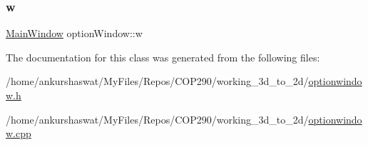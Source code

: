 \subsubsection{\texorpdfstring{w}{w}}
{\footnotesize\ttfamily \hyperlink{classMainWindow}{Main\+Window} option\+Window\+::w}



The documentation for this class was generated from the following files\+:\begin{DoxyCompactItemize}
\item 
/home/ankurshaswat/\+My\+Files/\+Repos/\+C\+O\+P290/working\+\_\+3d\+\_\+to\+\_\+2d/\hyperlink{optionwindow_8h}{optionwindow.\+h}\item 
/home/ankurshaswat/\+My\+Files/\+Repos/\+C\+O\+P290/working\+\_\+3d\+\_\+to\+\_\+2d/\hyperlink{optionwindow_8cpp}{optionwindow.\+cpp}\end{DoxyCompactItemize}
